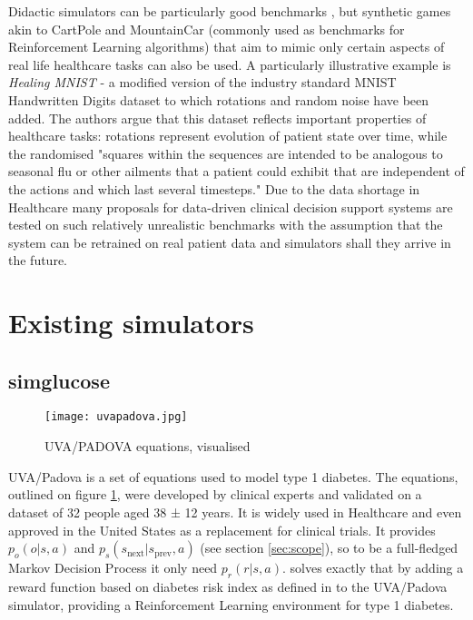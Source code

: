 Didactic simulators can be particularly good benchmarks \cite{anthropodidactic}, but synthetic games akin to CartPole \cite{cartpole} and MountainCar \cite{mountaincar} (commonly used as benchmarks for Reinforcement Learning algorithms) that aim to mimic only certain aspects of real life healthcare tasks can also be used.
A particularly illustrative example is \emph{Healing MNIST} \cite{healing-mnist} - a modified version of the industry standard MNIST Handwritten Digits \cite{mnist} dataset to which rotations and random noise have been added.
The authors argue that this dataset reflects important properties of healthcare tasks: rotations represent evolution of patient state over time, while the randomised "squares within the sequences are intended to be analogous to seasonal flu or other ailments that a patient could exhibit that are independent of the actions and which last several timesteps."
Due to the data shortage in Healthcare many proposals for data-driven clinical decision support systems are tested on such relatively unrealistic benchmarks with the assumption that the system can be retrained on real patient data and simulators shall they arrive in the future.

\section{Existing simulators}
\label{sec:existing}

\subsection{simglucose}
\label{sec:simglucose}

\begin{figure}
    \centering
    \texttt{[image: uvapadova.jpg]}
    \caption{UVA/PADOVA equations, visualised}
    \label{fig:uvapadova}
\end{figure}

UVA/Padova \cite{sim-diabetes-fda} is a set of equations used to model type 1 diabetes.
The equations, outlined on figure \ref{fig:uvapadova}, were developed by clinical experts and validated on a dataset of 32 people aged 38 ± 12 years.
It is widely used in Healthcare and even approved in the United States as a replacement for clinical trials.
It provides $p_o(o | s, a)$ and $p_s(s_\text{next} | s_\text{prev}, a)$ (see section \ref{sec:scope}), so to be a full-fledged Markov Decision Process it only need $p_r(r|s,a)$.
\cite{simglucose} solves exactly that by adding a reward function based on diabetes risk index as defined in \cite{diabetesrisk} to the UVA/Padova simulator, providing a Reinforcement Learning environment for type 1 diabetes.

